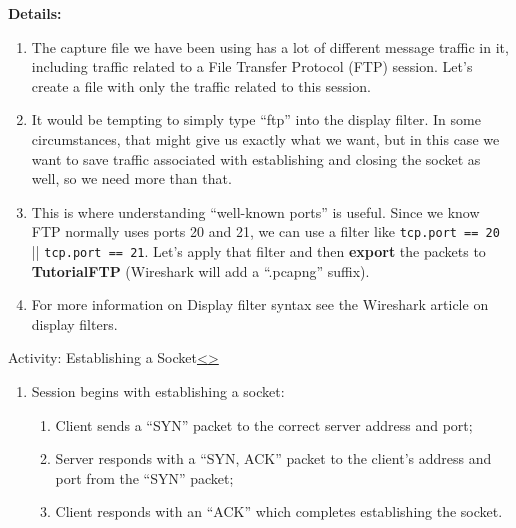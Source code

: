 \documentclass[12pt]{extarticle}
\newenvironment{instructionblock}{\Large\bgroup}{\egroup}
\newcommand{\ben}{\begin{enumerate}}
\newcommand{\een}{\end{enumerate}}
\begin{document}
	\vspace{6mm}
	\noindent
	\textbf{Details:}
	
	\ben
		\item The capture file we have been using has a lot of different message traffic in it, including traffic related to a File Transfer Protocol (FTP) session.  Let's create a file with only the traffic related to this session.  
		
		\item It would be tempting to simply type ``ftp'' into the display filter.  In some circumstances, that might give us exactly what we want, but in this case we want to save traffic associated with establishing and closing the socket as well, so we need more than that.  
		
		\item This is where understanding ``well-known ports'' is useful.  Since we know FTP normally uses ports 20 and 21, we can use a filter like \texttt{tcp.port == 20} || \texttt{tcp.port == 21}.  Let's apply that filter and then \textbf{export} the packets to \textbf{TutorialFTP} (Wireshark will add a ``.pcapng'' suffix).
		
		\item For more information on Display filter syntax see the Wireshark article on display filters. \cite{displayFilters}
	\een
	
	
	
	\pagebreak
	\begin{slide}{Activity: Establishing a Socket}{\hyperref[slide 18]{\textless}\hyperref[slide 20]{\textgreater}}
		\begin{instructionblock}
			\begin{enumerate}
				\item Session begins with establishing a socket:
				\ben
					\item Client sends a ``SYN'' packet to the correct server address and port;
					\item Server responds with a ``SYN, ACK'' packet to the client's address and port from the ``SYN'' packet;
					\item Client responds with an ``ACK'' which completes establishing the socket.
				\een
			\end{enumerate}
		\end{instructionblock}
	\end{slide}
	
\end{document}

